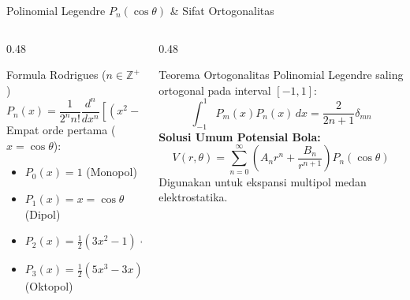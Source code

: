 \documentclass[aspectratio=169,10pt]{beamer}
\begin{document}
\begin{frame}{Polinomial Legendre $P_n(\cos\theta)$ \& Sifat Ortogonalitas}
  \begin{columns}[t]
    \begin{column}{0.48\textwidth}
      \begin{block}{Formula Rodrigues ($n \in \mathbb{Z}^+$)}
        \small
        \begin{equation*}
          P_n(x) = \frac{1}{2^n n!} \frac{d^n}{dx^n}\left[(x^2 - 1)^n\right]
        \end{equation*}
        Empat orde pertama ($x = \cos\theta$):
        \begin{itemize}
          \item $P_0(x) = 1$ (Monopol)
          \item $P_1(x) = x = \cos\theta$ (Dipol)
          \item $P_2(x) = \frac{1}{2}(3x^2 - 1) = \frac{1}{2}(3\cos^2\theta - 1)$
          \item $P_3(x) = \frac{1}{2}(5x^3 - 3x)$ (Oktopol)
        \end{itemize}
      \end{block}
    \end{column}
    \begin{column}{0.48\textwidth}
      \begin{alertblock}{Teorema Ortogonalitas}
        \small
        Polinomial Legendre saling ortogonal pada interval $[-1, 1]$:
        \begin{equation*}
          \int_{-1}^{1} P_m(x) P_n(x)\,dx = \frac{2}{2n + 1} \delta_{mn}
        \end{equation*}
        \textbf{Solusi Umum Potensial Bola:}
        \begin{equation*}
          V(r, \theta) = \sum_{n=0}^{\infty} \left(A_n r^n + \frac{B_n}{r^{n+1}}\right) P_n(\cos\theta)
        \end{equation*}
        Digunakan untuk ekspansi multipol medan elektrostatika.
      \end{alertblock}
    \end{column}
  \end{columns}
\end{frame}
\end{document}
